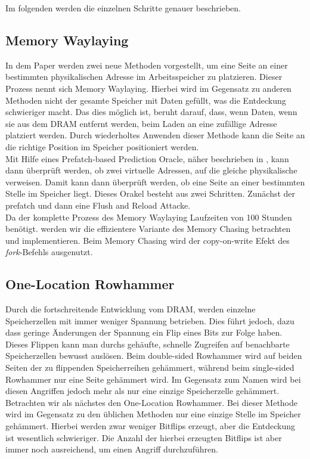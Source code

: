 \documentclass[conference]{IEEEtran}
\begin{document}
Im folgenden werden die einzelnen Schritte genauer beschrieben.

\subsection{Memory Waylaying}
In dem Paper werden zwei neue Methoden vorgestellt, um eine Seite an einer bestimmten physikalischen Adresse im Arbeitsspeicher zu platzieren. Dieser Prozess nennt sich Memory Waylaying. Hierbei wird im Gegensatz zu anderen Methoden nicht der gesamte Speicher mit Daten gefüllt, was die Entdeckung schwieriger macht. Das dies möglich ist, beruht darauf, dass, wenn Daten, wenn sie aus dem DRAM entfernt werden, beim Laden an eine zufällige Adresse platziert werden. Durch wiederholtes Anwenden dieser Methode kann die Seite an die richtige Position im Speicher positioniert werden.\\
 Mit Hilfe eines Prefatch-based Prediction Oracle, näher beschrieben in \cite{DBLP:conf/ccs/2016}, kann dann überprüft werden, ob zwei virtuelle Adressen, auf die gleiche physikalische verweisen. Damit kann dann überprüft werden, ob eine Seite an einer bestimmten Stelle im Speicher liegt. Dieses Orakel besteht aus zwei Schritten. Zunächst der prefatch und dann eine Flush and Reload Attacke. \\
Da der komplette Prozess des Memory Waylaying Laufzeiten von 100 Stunden benötigt. werden wir die effizientere Variante des Memory Chasing betrachten und implementieren. Beim Memory Chasing wird der copy-on-write Efekt des \textit{fork}-Befehls ausgenutzt.
\subsection{One-Location Rowhammer}
Durch die fortschreitende Entwicklung vom DRAM, werden einzelne Speicherzellen mit immer weniger Spannung betrieben. Dies führt jedoch, dazu dass geringe Änderungen der Spannung ein Flip eines Bits zur Folge haben. Dieses Flippen kann man durchs gehäufte, schnelle Zugreifen auf benachbarte Speicherzellen bewusst auslösen.
 Beim double-sided Rowhammer wird auf beiden Seiten der zu flippenden Speicherreihen gehämmert, während beim single-sided Rowhammer nur eine Seite gehämmert wird. Im Gegensatz zum Namen wird bei diesen Angriffen jedoch mehr als nur eine einzige Speicherzelle gehämmert.\\
Betrachten wir als nächstes den One-Location Rowhammer. Bei dieser Methode wird im Gegensatz zu den üblichen Methoden nur eine einzige Stelle im Speicher gehämmert. Hierbei werden zwar weniger Bitflips erzeugt, aber die Entdeckung ist wesentlich schwieriger. Die Anzahl der hierbei erzeugten Bitflips ist aber immer noch ausreichend, um einen Angriff durchzuführen.
\end{document}
